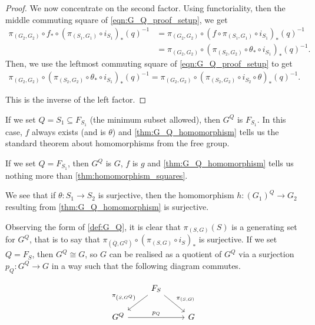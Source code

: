 \begin{proof}
	We now concentrate on the second factor.
	Using functoriality, then the middle commuting square of \eqref{eqn:G_Q_proof_setup}, we get
	\begin{align*}
		\pi_{(G_2,G_2)} \circ f_* \circ\left( \pi_{(S_1,G_1)} \circ i_{S_1}\right)_*(q)^{-1} & = \pi_{(G_2,G_2)} \circ \left( f \circ \pi_{(S_1,G_1)} \circ i_{S_1}\right)_*(q)^{-1}
		\\ &= \pi_{(G_2,G_2)} \circ \left(\pi_{(S_2,G_2)} \circ \theta_* \circ i_{S_1}\right)_*(q)^{-1}.
	\end{align*}
	Then, we use the leftmost commuting square of \eqref{eqn:G_Q_proof_setup} to get
	\begin{align*}
		\pi_{(G_2,G_2)} \circ \left(\pi_{(S_2,G_2)} \circ \theta_* \circ i_{S_1}\right)_*(q)^{-1} = \pi_{(G_2,G_2)} \circ \left(\pi_{(S_2,G_2)} \circ i_{S_2} \circ \theta \right)_*(q)^{-1}.
	\end{align*}

	This is the inverse of the left factor.
\end{proof}

\begin{remark}
	If we set $Q = S_1 \subseteq F_{S_1}$ (the minimum subset allowed), then  $G^Q$ is  $F_{S_1}$.
	In this case, $f$ always exists (and is  $\theta$) and \cref{thm:G_Q_homomorphism} tells us the standard theorem about homomorphisms from the free group.
\end{remark}

\begin{remark}
	If we set $Q = F_{S_1}$, then $G^Q$ is  $G$, $f$ is $g$ and \cref{thm:G_Q_homomorphism} tells us nothing more than  \cref{thm:homomorphism_squares}.
\end{remark}

We see that if $\theta \colon S_1 \to S_2$ is surjective, then the homomorphism $h \colon (G_1)^Q \to G_2$ resulting from \cref{thm:G_Q_homomorphism} is surjective.

Observing the form of \cref{def:G_Q}, it is clear that $\pi_{(S,G)}(S)$ is a generating set for $G^Q$, that is to say that $\pi_{(\overline{Q},G^Q)} \circ \left(\pi_{(S,G)} \circ i_S \right)_*$ is surjective.
If we set $Q=F_S$, then $G^Q \cong G$, so $G$ can be realised as a quotient of $G^Q$ via a surjection $p_Q \colon G^Q \to G$ in a way such that the following diagram commutes.

\begin{equation*}
	\begin{tikzcd}
		& F_S \ar[dl, "\pi_{\left(S,G^Q\right)}"'] \ar[dr, "\pi_{\left(S,G\right)}"] &
		\\ G^Q \ar[rr, "p_Q"]  & & G
	\end{tikzcd}
\end{equation*}

